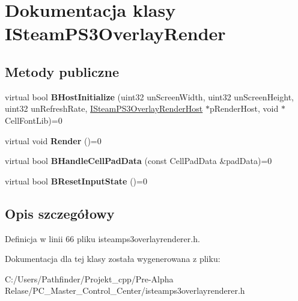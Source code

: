 \hypertarget{class_i_steam_p_s3_overlay_render}{}\section{Dokumentacja klasy I\+Steam\+P\+S3\+Overlay\+Render}
\label{class_i_steam_p_s3_overlay_render}
\subsection*{Metody publiczne}
\begin{DoxyCompactItemize}
\item 
\mbox{\label{class_i_steam_p_s3_overlay_render_a4bff87fff2d1b7a0518e7e14d1dadf2a}} 
virtual bool {\bfseries B\+Host\+Initialize} (uint32 un\+Screen\+Width, uint32 un\+Screen\+Height, uint32 un\+Refresh\+Rate, \hyperlink{class_i_steam_p_s3_overlay_render_host}{I\+Steam\+P\+S3\+Overlay\+Render\+Host} $\ast$p\+Render\+Host, void $\ast$Cell\+Font\+Lib)=0
\item 
\mbox{\label{class_i_steam_p_s3_overlay_render_ad1579d69d1a96ab0e2fdf0fe9d3bedd5}} 
virtual void {\bfseries Render} ()=0
\item 
\mbox{\label{class_i_steam_p_s3_overlay_render_a293c3b6dd03f1a5de1e6346bced4e58d}} 
virtual bool {\bfseries B\+Handle\+Cell\+Pad\+Data} (const Cell\+Pad\+Data \&pad\+Data)=0
\item 
\mbox{\label{class_i_steam_p_s3_overlay_render_a4f5d18304e355703ef94bf84a4f1057f}} 
virtual bool {\bfseries B\+Reset\+Input\+State} ()=0
\end{DoxyCompactItemize}


\subsection{Opis szczegółowy}


Definicja w linii 66 pliku isteamps3overlayrenderer.\+h.



Dokumentacja dla tej klasy została wygenerowana z pliku\+:\begin{DoxyCompactItemize}
\item 
C\+:/\+Users/\+Pathfinder/\+Projekt\+\_\+cpp/\+Pre-\/\+Alpha Relase/\+P\+C\+\_\+\+Master\+\_\+\+Control\+\_\+\+Center/isteamps3overlayrenderer.\+h\end{DoxyCompactItemize}
